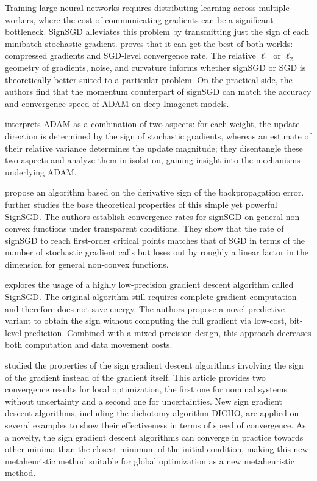 \documentclass[11pt]{book}
\begin{document}
Training large neural networks requires distributing learning across
multiple workers, where the cost of communicating gradients can be
a significant bottleneck. SignSGD alleviates this problem by transmitting
just the sign of each minibatch stochastic gradient. \cite{bernstein2018signsgd}
proves that it can get the best of both worlds: compressed gradients
and SGD-level convergence rate. The relative $\ell_{1}$ or $\ell_{2}$
geometry of gradients, noise, and curvature informs whether signSGD
or SGD is theoretically better suited to a particular problem. On
the practical side, the authors find that the momentum counterpart
of signSGD can match the accuracy and convergence speed of ADAM on
deep Imagenet models.

\cite{balles2018dissecting} interprets ADAM as a combination of two
aspects: for each weight, the update direction is determined by the
sign of stochastic gradients, whereas an estimate of their relative
variance determines the update magnitude; they disentangle these two
aspects and analyze them in isolation, gaining insight into the mechanisms
underlying ADAM. 

\cite{zhang2018sign} propose an algorithm based on the derivative
sign of the backpropagation error. \cite{bernstein2018convergence}
further studies the base theoretical properties of this simple yet
powerful SignSGD. The authors establish convergence rates for signSGD
on general non-convex functions under transparent conditions. They
show that the rate of signSGD to reach first-order critical points
matches that of SGD in terms of the number of stochastic gradient
calls but loses out by roughly a linear factor in the dimension for
general non-convex functions.

\cite{wang2019e2} explores the usage of a highly low-precision gradient
descent algorithm called SignSGD. The original algorithm still requires
complete gradient computation and therefore does not save energy.
The authors propose a novel \textquotedbl predictive\textquotedbl{}
variant to obtain the sign without computing the full gradient via
low-cost, bit-level prediction. Combined with a mixed-precision design,
this approach decreases both computation and data movement costs.

\cite{moulay2019properties} studied the properties of the sign gradient
descent algorithms involving the sign of the gradient instead of the
gradient itself. This article provides two convergence results for
local optimization, the first one for nominal systems without uncertainty
and a second one for uncertainties. New sign gradient descent algorithms,
including the dichotomy algorithm DICHO, are applied on several examples
to show their effectiveness in terms of speed of convergence. As a
novelty, the sign gradient descent algorithms can converge in practice
towards other minima than the closest minimum of the initial condition,
making this new metaheuristic method suitable for global optimization
as a new metaheuristic method.
\end{document}
